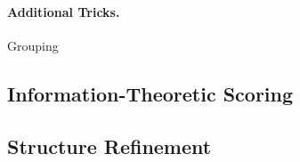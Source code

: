 \begin {figure*}
\begin{center}
\begin{minipage}[t]{0.5\columnwidth}
\end{minipage}
\begin{minipage}[t]{0.5\columnwidth}
\end{minipage}
\begin{minipage}[t]{0.5\columnwidth}
\end{minipage}
\begin{minipage}[t]{0.5\columnwidth}
\end{minipage}
%
%
%
\caption{Selected Histograms for Crashreporter.log and Dibbler.1000}
\label{fig:histograms} 
\end{center}
\end{figure*}

\paragraph*{Additional Tricks.}
Grouping




\subsection {Information-Theoretic Scoring}



\subsection {Structure Refinement}

